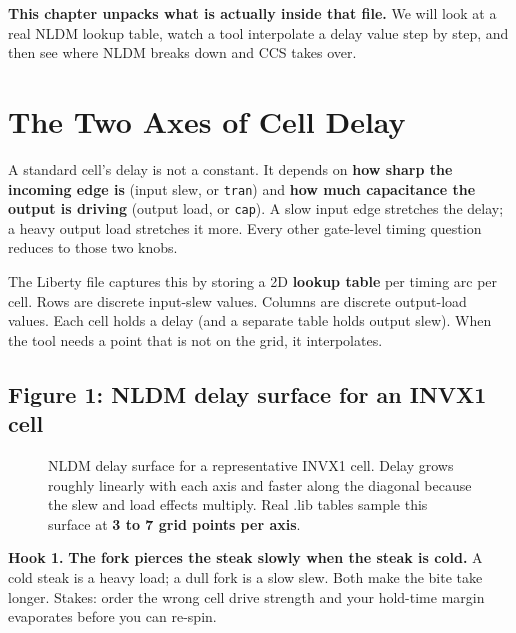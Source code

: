 \textbf{This chapter unpacks what is actually inside that file.} We will look at a real NLDM lookup table, watch a tool interpolate a delay value step by step, and then see where NLDM breaks down and CCS takes over.

\section{The Two Axes of Cell Delay}

A standard cell's delay is not a constant. It depends on \textbf{how sharp the incoming edge is} (input slew, or \texttt{tran}) and \textbf{how much capacitance the output is driving} (output load, or \texttt{cap}). A slow input edge stretches the delay; a heavy output load stretches it more. Every other gate-level timing question reduces to those two knobs.

The Liberty file captures this by storing a 2D \textbf{lookup table} per timing arc per cell. Rows are discrete input-slew values. Columns are discrete output-load values. Each cell holds a delay (and a separate table holds output slew). When the tool needs a point that is not on the grid, it interpolates.

\subsection*{Figure 1: NLDM delay surface for an INVX1 cell}

\begin{figure}[h]
\centering
{}
\caption{NLDM delay surface for a representative INVX1 cell. Delay grows roughly linearly with each axis and faster along the diagonal because the slew and load effects multiply. Real .lib tables sample this surface at \textbf{3 to 7 grid points per axis}.}
\end{figure}

\begin{hook}
\textbf{Hook 1.} \textbf{The fork pierces the steak slowly when the steak is cold.} A cold steak is a heavy load; a dull fork is a slow slew. Both make the bite take longer. Stakes: order the wrong cell drive strength and your hold-time margin evaporates before you can re-spin.
\end{hook}

